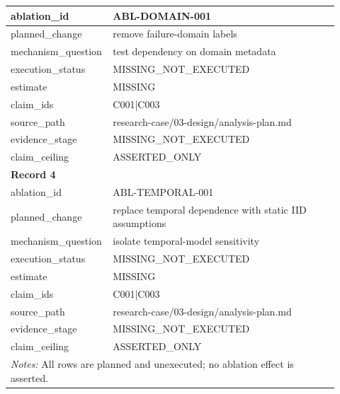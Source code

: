 \begin{longtable}{|p{0.24\linewidth}|p{0.68\linewidth}|}
ablation\_\allowbreak{}id & ABL-DOMAIN-001 \\ \hline
planned\_\allowbreak{}change & remove failure-domain labels \\ \hline
mechanism\_\allowbreak{}question & test dependency on domain metadata \\ \hline
execution\_\allowbreak{}status & MISSING\_\allowbreak{}NOT\_\allowbreak{}EXECUTED \\ \hline
estimate & MISSING \\ \hline
claim\_\allowbreak{}ids & C001|C003 \\ \hline
source\_\allowbreak{}path & research-case/03-design/analysis-plan.md \\ \hline
evidence\_\allowbreak{}stage & MISSING\_\allowbreak{}NOT\_\allowbreak{}EXECUTED \\ \hline
claim\_\allowbreak{}ceiling & ASSERTED\_\allowbreak{}ONLY \\ \hline
\multicolumn{2}{|l|}{\textbf{Record 4}} \\ \hline
ablation\_\allowbreak{}id & ABL-TEMPORAL-001 \\ \hline
planned\_\allowbreak{}change & replace temporal dependence with static IID assumptions \\ \hline
mechanism\_\allowbreak{}question & isolate temporal-model sensitivity \\ \hline
execution\_\allowbreak{}status & MISSING\_\allowbreak{}NOT\_\allowbreak{}EXECUTED \\ \hline
estimate & MISSING \\ \hline
claim\_\allowbreak{}ids & C001|C003 \\ \hline
source\_\allowbreak{}path & research-case/03-design/analysis-plan.md \\ \hline
evidence\_\allowbreak{}stage & MISSING\_\allowbreak{}NOT\_\allowbreak{}EXECUTED \\ \hline
claim\_\allowbreak{}ceiling & ASSERTED\_\allowbreak{}ONLY \\ \hline
\multicolumn{2}{|p{0.92\linewidth}|}{\textit{Notes:} All rows are planned and unexecuted; no ablation effect is asserted.} \\ \hline
\end{longtable}
\endgroup

